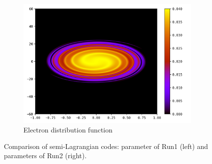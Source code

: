 \documentclass{article}
\numberwithin{equation}{section}
\newcommand{\imh}{\textheight} %
\newcommand{\imw}{\textwidth} %
\begin{document}
\begin{figure}
\begin{subfigure}{\textwidth}
		\includegraphics[height=\imh,width=\imw]{images/fe_run5ac.png}
		\caption{Electron distribution function}
	\end{subfigure}
	\caption{Comparison of semi-Lagrangian codes: parameter of Run1 (left) and parameters of Run2 (right).}
	\label{fig:comp_phasespace}
\end{figure}  
\end{document}
